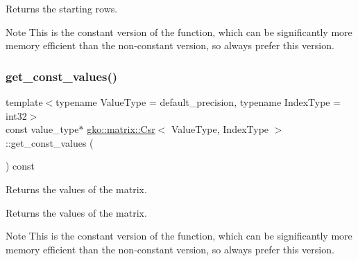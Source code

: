 \begin{DoxyReturn}{Returns}
the starting rows.
\end{DoxyReturn}
\begin{DoxyNote}{Note}
This is the constant version of the function, which can be significantly more memory efficient than the non-\/constant version, so always prefer this version. 
\end{DoxyNote}
\mbox{\label{classgko_1_1matrix_1_1Csr_a1801347665214bbefc837b44ba0695ff}} 
\subsubsection{\texorpdfstring{get\+\_\+const\+\_\+values()}{get\_const\_values()}}
{\footnotesize\ttfamily template$<$typename Value\+Type = default\+\_\+precision, typename Index\+Type = int32$>$ \\
const value\+\_\+type$\ast$ \hyperlink{classgko_1_1matrix_1_1Csr}{gko\+::matrix\+::\+Csr}$<$ Value\+Type, Index\+Type $>$\+::get\+\_\+const\+\_\+values (\begin{DoxyParamCaption}{ }\end{DoxyParamCaption}) const\hspace{0.3cm}{\ttfamily [noexcept]}}



Returns the values of the matrix. 

\begin{DoxyReturn}{Returns}
the values of the matrix.
\end{DoxyReturn}
\begin{DoxyNote}{Note}
This is the constant version of the function, which can be significantly more memory efficient than the non-\/constant version, so always prefer this version. 
\end{DoxyNote}
\mbox{\label{classgko_1_1matrix_1_1Csr_a5b8c25c2fb1bbea62a3afdec8f8340c5}} 
